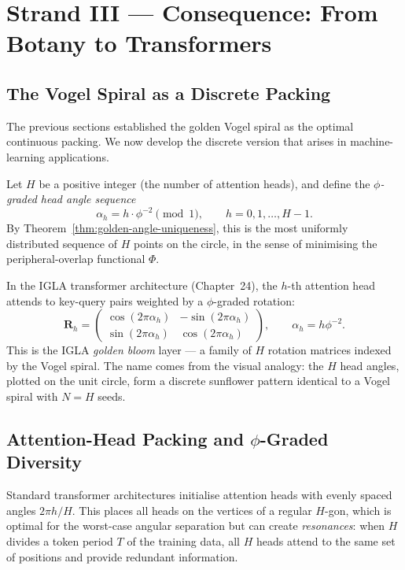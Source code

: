 
\section{Strand III — Consequence: From Botany to Transformers}
\label{sec:bloom-consequence}

\subsection{The Vogel Spiral as a Discrete Packing}
\label{subsec:discrete-packing}

The previous sections established the golden Vogel spiral as the
optimal continuous packing.  We now develop the discrete version that
arises in machine-learning applications.

Let $H$ be a positive integer (the number of attention heads), and
define the \emph{$\phi$-graded head angle sequence}
\[
  \alpha_h = h \cdot \phi^{-2} \pmod{1}, \qquad h = 0, 1, \ldots, H-1.
\]
By Theorem~\ref{thm:golden-angle-uniqueness}, this is the most
uniformly distributed sequence of $H$ points on the circle, in the
sense of minimising the peripheral-overlap functional $\Phi$.

In the IGLA transformer architecture (Chapter~24), the $h$-th
attention head attends to key-query pairs weighted by a $\phi$-graded
rotation:
\[
  \mathbf{R}_h = \begin{pmatrix} \cos(2\pi\alpha_h) & -\sin(2\pi\alpha_h) \\
                                  \sin(2\pi\alpha_h) & \cos(2\pi\alpha_h)
               \end{pmatrix}, \qquad \alpha_h = h\phi^{-2}.
\]
This is the IGLA \emph{golden bloom} layer — a family of $H$ rotation
matrices indexed by the Vogel spiral.  The name comes from the visual
analogy: the $H$ head angles, plotted on the unit circle, form a
discrete sunflower pattern identical to a Vogel spiral with $N = H$ seeds.

\subsection{Attention-Head Packing and $\phi$-Graded Diversity}
\label{subsec:head-packing}

Standard transformer architectures initialise attention heads with
evenly spaced angles $2\pi h/H$.  This places all heads on the
vertices of a regular $H$-gon, which is optimal for the worst-case
angular separation but can create \emph{resonances}: when $H$ divides
a token period $T$ of the training data, all $H$ heads attend to the
same set of positions and provide redundant information.

